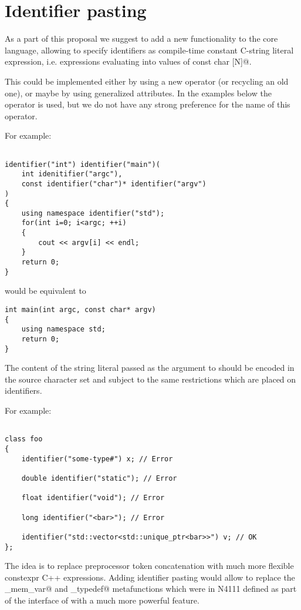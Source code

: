 \section{Identifier pasting}

As a part of this proposal we suggest to add a new functionality to the core language,
allowing to specify identifiers as compile-time constant C-string literal expression, i.e. expressions
evaluating into values of \verb@constexpr const char [N]@.

This could be implemented either by using a new operator (or recycling an old one),
or maybe by using generalized attributes.
In the examples below the \verb@identifier@ operator is used, but we do not have
any strong preference for the name of this operator.

For example:

\begin{verbatim}

identifier("int") identifier("main")(
	int idenitifier("argc"),
	const identifier("char")* identifier("argv")
)
{
	using namespace identifier("std");
	for(int i=0; i<argc; ++i)
	{
		cout << argv[i] << endl;
	}
	return 0;
}

\end{verbatim}

would be equivalent to

\begin{verbatim}
int main(int argc, const char* argv)
{
	using namespace std;
	return 0;
}
\end{verbatim}

The content of the string literal passed as the argument to \verb@identifier@
should be encoded in the source character set and subject to the same restrictions
which are placed on identifiers.

For example:

\begin{verbatim}

class foo
{
	identifier("some-type#") x; // Error

	double identifier("static"); // Error

	float identifier("void"); // Error

	long identifier("<bar>"); // Error

	identifier("std::vector<std::unique_ptr<bar>>") v; // OK
};

\end{verbatim}

The idea is to replace preprocessor token concatenation with much more
flexible constexpr C++ expressions.
Adding identifier pasting would allow to replace the \verb@named_mem_var@
and \verb@named_typedef@ metafunctions which were in N4111 defined as part of
the interface of  with a much more powerful feature.

